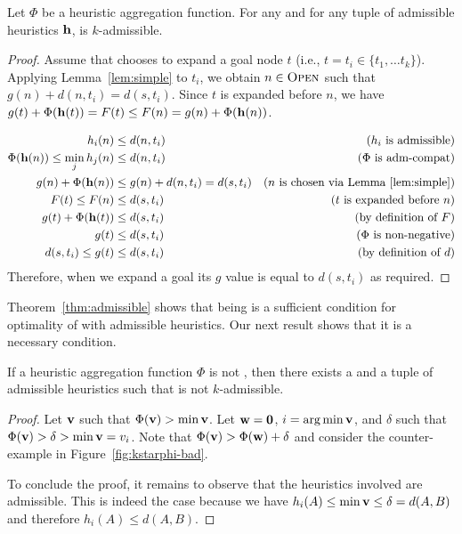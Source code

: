 \begin{theorem}
  \label{thm:admissible}
  Let $\Phi$ be a \axiomadm heuristic aggregation function.
  For any \kgs and for any tuple of admissible heuristics $\mathbf{h}$, \kastarphi is $k$-admissible.
\end{theorem}
\begin{proof}
  Assume that \kastarphi chooses to expand a goal node $t$ (i.e., $t=t_i\in\{t_1,\ldots t_k\}$).
  Applying Lemma~\ref{lem:simple} to $t_i$, we obtain $n\in \textsc{Open}$ such that $g(n) + d(n, t_i) = d(s, t_i)$.
  Since $t$ is expanded before $n$, we have $g(t) + \Phi(\mathbf{h}(t)) = F(t) \leq F(n) = g(n) + \Phi(\mathbf{h}(n))$.

  \begin{align}
    h_i(n) & \leq d(n,t_i) & \text{($h_i$ is admissible)}\\
    \Phi(\mathbf{h}(n)) \leq \min_j h_j(n) & \leq d(n,t_i) & \text{($\Phi$ is adm-compat)}\\
    g(n) + \Phi(\mathbf{h}(n)) & \leq g(n) + d(n, t_i) = d(s, t_i) & \text{($n$ is chosen via Lemma~\ref{lem:simple})}\\
    F(t) \leq F(n) & \leq d(s, t_i) & \text{($t$ is expanded before $n$)}\\
    g(t) + \Phi(\mathbf{h}(t)) & \leq d(s, t_i) & \text{(by definition of $F$)}\\
    g(t) & \leq d(s, t_i) & \text{($\Phi$ is non-negative)}\\
    d(s, t_i) \leq g(t) & \leq d(s, t_i) & \text{(by definition of $d$)}
  \end{align}
  Therefore, when we expand a goal its $g$ value is equal to $d(s,t_i)$ as required.
\end{proof}

Theorem~\ref{thm:admissible} shows that being \axiomadm is a sufficient condition for optimality of \kastarphi with admissible heuristics.
Our next result shows that it is a necessary condition.

\begin{theorem}
  \label{thm:admissible-dual}
  If a heuristic aggregation function $\Phi$ is not \axiomadm, then there exists a \kgs and a tuple of admissible heuristics such that \kastarphi is not $k$-admissible.
\end{theorem}
\begin{proof}
  Let $\mathbf{v}$ such that $\Phi(\mathbf{v}) > \min \mathbf{v}$.
  Let $\mathbf{w} = \mathbf{0}$, $i = \operatorname*{arg\,min} \mathbf{v}$, and $\delta$ such that $\Phi(\mathbf{v}) > \delta > \min \mathbf{v} = v_i$.
  Note that $\Phi(\mathbf{v}) > \Phi(\mathbf{w}) + \delta$ and consider the counter-example in Figure~\ref{fig:kstarphi-bad}.

  To conclude the proof, it remains to observe that the heuristics involved are admissible.
  This is indeed the case because we have $h_i(A) \leq \min \mathbf{v} \leq \delta = d(A, B)$ and therefore $h_i(A) \leq d(A, B)$.
\end{proof}


